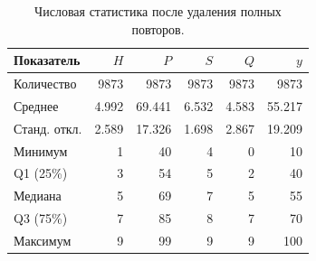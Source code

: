 \begin{table}[H]\centering\small
\begin{tabular}{lrrrrr}\toprule
Показатель & $H$ & $P$ & $S$ & $Q$ & $y$\\\midrule
Количество & 9873 & 9873 & 9873 & 9873 & 9873\\
Среднее & 4.992 & 69.441 & 6.532 & 4.583 & 55.217\\
Станд. откл. & 2.589 & 17.326 & 1.698 & 2.867 & 19.209\\
Минимум & 1 & 40 & 4 & 0 & 10\\
Q1 (25\%) & 3 & 54 & 5 & 2 & 40\\
Медиана & 5 & 69 & 7 & 5 & 55\\
Q3 (75\%) & 7 & 85 & 8 & 7 & 70\\
Максимум & 9 & 99 & 9 & 9 & 100\\
\bottomrule\end{tabular}
\caption{Числовая статистика после удаления полных повторов.}
\label{tab:statistics}
\end{table}
